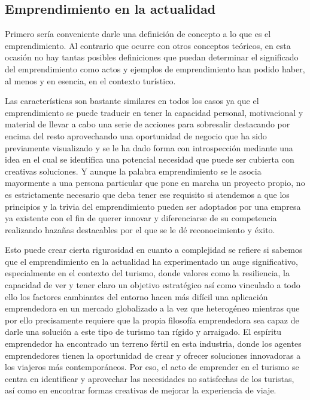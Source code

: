 \documentclass[
  letterpaper,
  DIV=11,
  numbers=noendperiod]{scrreprt}
\begin{document}
\hypertarget{emprendimiento-en-la-actualidad}{%
\subsection{Emprendimiento en la
actualidad}\label{emprendimiento-en-la-actualidad}}

Primero sería conveniente darle una definición de concepto a lo que es
el emprendimiento. Al contrario que ocurre con otros conceptos teóricos,
en esta ocasión no hay tantas posibles definiciones que puedan
determinar el significado del emprendimiento como actos y ejemplos de
emprendimiento han podido haber, al menos y en esencia, en el contexto
turístico.

Las características son bastante similares en todos los casos ya que el
emprendimiento se puede traducir en tener la capacidad personal,
motivacional y material de llevar a cabo una serie de acciones para
sobresalir destacando por encima del resto aprovechando una oportunidad
de negocio que ha sido previamente visualizado y se le ha dado forma con
introspección mediante una idea en el cual se identifica una potencial
necesidad que puede ser cubierta con creativas soluciones. Y aunque la
palabra emprendimiento se le asocia mayormente a una persona particular
que pone en marcha un proyecto propio, no es estrictamente necesario que
deba tener ese requisito si atendemos a que los principios y la trivia
del emprendimiento pueden ser adoptados por una empresa ya existente con
el fin de querer innovar y diferenciarse de su competencia realizando
hazañas destacables por el que se le dé reconocimiento y éxito.

Esto puede crear cierta rigurosidad en cuanto a complejidad se refiere
si sabemos que el emprendimiento en la actualidad ha experimentado un
auge significativo, especialmente en el contexto del turismo, donde
valores como la resiliencia, la capacidad de ver y tener claro un
objetivo estratégico así como vinculado a todo ello los factores
cambiantes del entorno hacen más difícil una aplicación emprendedora en
un mercado globalizado a la vez que heterogéneo mientras que por ello
precisamente requiere que la propia filosofía emprendedora sea capaz de
darle una solución a este tipo de turismo tan rígido y arraigado. El
espíritu emprendedor ha encontrado un terreno fértil en esta industria,
donde los agentes emprendedores tienen la oportunidad de crear y ofrecer
soluciones innovadoras a los viajeros más contemporáneos. Por eso, el
acto de emprender en el turismo se centra en identificar y aprovechar
las necesidades no satisfechas de los turistas, así como en encontrar
formas creativas de mejorar la experiencia de viaje.
\end{document}
